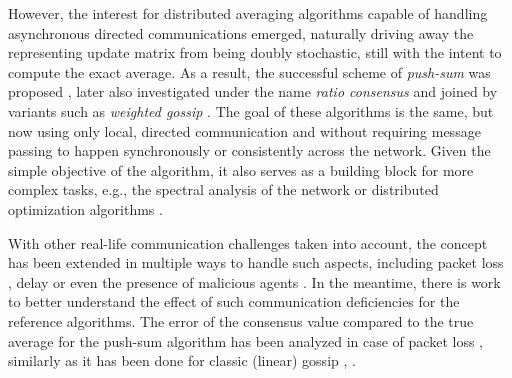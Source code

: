 \documentclass[a4paper,12pt]{article}
\begin{document}
	
	
	However, the interest for distributed averaging algorithms capable of handling asynchronous directed communications emerged, naturally driving away the representing update matrix from being doubly stochastic, still with the intent to compute the exact average. As a result, the successful scheme of \emph{push-sum} was proposed \cite{kempe2003gossip}, later also
	investigated under the name \emph{ratio consensus} \cite{hadjicostis2014average} and joined by variants such as \emph{weighted gossip} \cite{benezit2010weighted}.
	The goal of these algorithms is the same, 
	but now using only local, directed communication and without requiring message passing to happen synchronously or consistently across the network. Given the simple objective of the algorithm, it also serves as a building block for more complex tasks, e.g., the spectral analysis of the network \cite{kempe2008decentralized} or distributed optimization algorithms \cite{nedic2014distributed}.
	
	With other real-life communication challenges taken into account, the concept has been extended in multiple ways to handle such aspects, including packet loss \cite{hadjicostis2015robust} \cite{olshevsky2018fully}, delay \cite{hadjicostis2014average} or even the presence of malicious agents \cite{hadjicostis2022trustworthy}.
	In the meantime, there is work to better understand the effect of such communication deficiencies for the reference algorithms. The error of the consensus value compared to the true average for the push-sum algorithm has been analyzed in case of packet loss \cite{gerencser2018push}, similarly as it has been done for classic (linear) gossip \cite{frasca2013large}, \cite{olfati2004consensus}.
	
\end{document}
